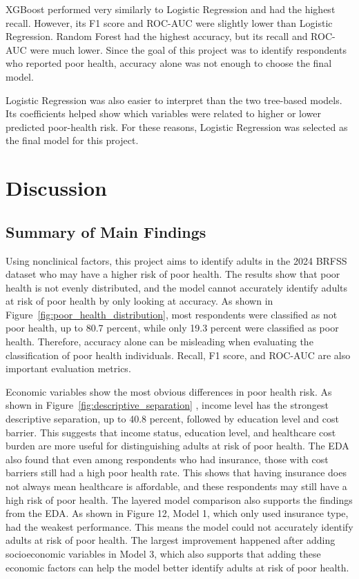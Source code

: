 XGBoost performed very similarly to Logistic Regression and had the highest recall. However, its F1 score and ROC-AUC were slightly lower than Logistic Regression. Random Forest had the highest accuracy, but its recall and ROC-AUC were much lower. Since the goal of this project was to identify respondents who reported poor health, accuracy alone was not enough to choose the final model.

Logistic Regression was also easier to interpret than the two tree-based models. Its coefficients helped show which variables were related to higher or lower predicted poor-health risk. For these reasons, Logistic Regression was selected as the final model for this project.

\section{Discussion}

\subsection{Summary of Main Findings}
Using nonclinical factors, this project aims to identify adults in the 2024 BRFSS dataset who may have a higher risk of poor health. The results show that poor health is not evenly distributed, and the model cannot accurately identify adults at risk of poor health by only looking at accuracy. As shown in Figure~\ref{fig:poor_health_distribution}, most respondents were classified as not poor health, up to 80.7 percent, while only 19.3 percent were classified as poor health. Therefore, accuracy alone can be misleading when evaluating the classification of poor health individuals. Recall, F1 score, and ROC-AUC are also important evaluation metrics.

Economic variables show the most obvious differences in poor health risk. As shown in Figure~\ref{fig:descriptive_separation} , income level has the strongest descriptive separation, up to 40.8 percent, followed by education level and cost barrier. This suggests that income status, education level, and healthcare cost burden are more useful for distinguishing adults at risk of poor health. The EDA also found that even among respondents who had insurance, those with cost barriers still had a high poor health rate. This shows that having insurance does not always mean healthcare is affordable, and these respondents may still have a high risk of poor health.
The layered model comparison also supports the findings from the EDA. As shown in Figure 12, Model 1, which only used insurance type, had the weakest performance. This means the model could not accurately identify adults at risk of poor health. The largest improvement happened after adding socioeconomic variables in Model 3, which also supports that adding these economic factors can help the model better identify adults at risk of poor health.

